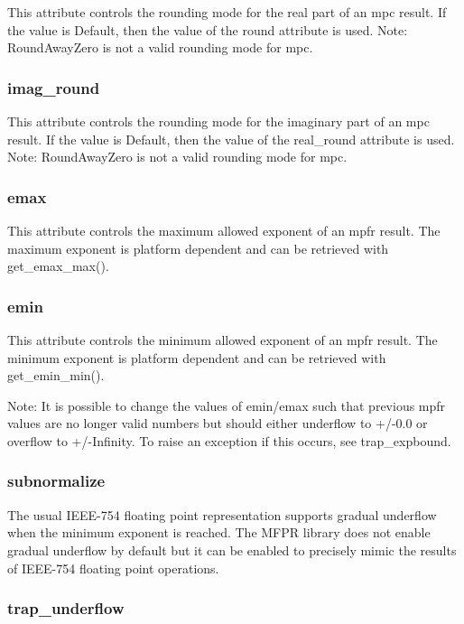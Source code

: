 This attribute controls the rounding mode for the real part of an mpc result. If the value is
Default, then the value of the round attribute is used. Note: RoundAwayZero is not a valid
rounding mode for mpc.

\subsubsection{imag\_round}

This attribute controls the rounding mode for the imaginary part of an mpc result. If the value is
Default, then the value of the real\_round attribute is used. Note: RoundAwayZero is not a valid
rounding mode for mpc.

\subsubsection{emax}

This attribute controls the maximum allowed exponent of an mpfr result. The maximum
exponent is platform dependent and can be retrieved with get\_emax\_max().

\subsubsection{emin}

This attribute controls the minimum allowed exponent of an mpfr result. The minimum exponent
is platform dependent and can be retrieved with get\_emin\_min().

\vpara
Note: It is possible to change the values of emin/emax such that previous mpfr values are no
longer valid numbers but should either underflow to +/-0.0 or overflow to +/-Infinity. To
raise an exception if this occurs, see trap\_expbound.

\subsubsection{subnormalize}

The usual IEEE-754 floating point representation supports gradual underflow when the
minimum exponent is reached. The MFPR library does not enable gradual underflow by default
but it can be enabled to precisely mimic the results of IEEE-754 floating point operations.

\subsubsection{trap\_underflow}


